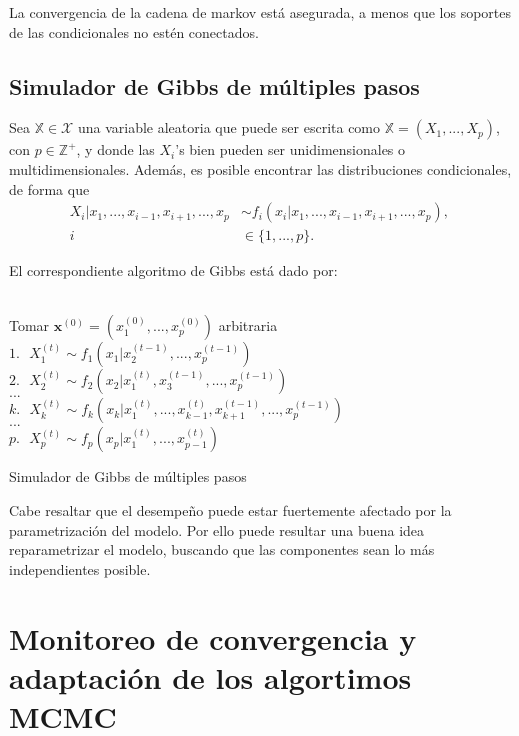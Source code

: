 La convergencia de la cadena de markov está asegurada, a menos que los soportes de las condicionales no estén conectados.

\subsection{Simulador de Gibbs de múltiples pasos}

Sea $\mathbb{X} \in \mathcal{X}$ una variable aleatoria que puede ser escrita como $\mathbb{X} = (X_1,...,X_p)$, con $p \in \mathbb{Z}^+$, y donde las $X_i$'s bien pueden ser unidimensionales o multidimensionales. Además, es posible encontrar las distribuciones condicionales, de forma que
\begin{equation*}
\begin{aligned}
X_i|x_1,...,x_{i-1},x_{i+1},...,x_p &\sim f_i(x_i|x_1,...,x_{i-1},x_{i+1},...,x_p) \text{, }\\
i &\in \{1,...,p\}.
\end{aligned}
\end{equation*}

El correspondiente algoritmo de Gibbs está dado por:
\\ \\
\begin{algorithm}[H]
 Tomar $\textbf{x}^{(0)} = (x_1^{(0)},...,x_p^{(0)})$ arbitraria\;
 {
    $1. \text{ } X_1^{(t)} \sim f_1(x_1|x_2^{(t-1)},...,x_p^{(t-1)})\;$\\
    $2. \text{ } X_2^{(t)} \sim f_2(x_2|x_1^{(t)},x_3^{(t-1)},...,x_p^{(t-1)})\;$\\
    $...\;$\\
    $k.  \text{ } X_k^{(t)} \sim f_k(x_k|x_1^{(t)},...,x_{k-1}^{(t)},x_{k+1}^{(t-1)},...,x_p^{(t-1)})\;$\\
    $...\;$\\
    $p.  \text{ }X_p^{(t)} \sim f_p(x_p|x_1^{(t)},...,x_{p-1}^{(t)})\;$\\
 }
 \caption{Simulador de Gibbs de múltiples pasos}
\end{algorithm}
\BlankLine

Cabe resaltar que el desempeño puede estar fuertemente afectado por la parametrización del modelo. Por ello puede resultar una buena idea reparametrizar el modelo, buscando que las componentes sean lo más independientes posible.

\section {Monitoreo de convergencia y adaptación de los algortimos MCMC}

